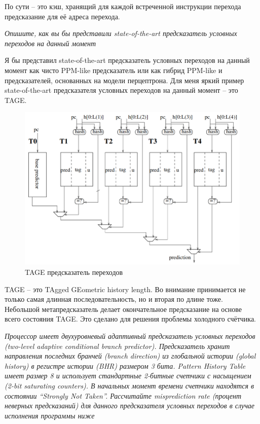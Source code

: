 	По сути -- это кэш, хранящий для каждой встреченной инструкции перехода предсказание для её адреса перехода.

	\textit{Опишите, как вы бы представили state-of-the-art предсказатель условных переходов на данный момент}
	
	Я бы представил state-of-the-art предсказатель условных переходов на данный момент как чисто PPM-like предсказатель или как гибрид PPM-like и предсказателей, основанных на модели перцептрона. Для меня яркий пример state-of-the-art предсказателя условных переходов на данный момент -- это TAGE.
	
	\begin{figure}[h!]
		\centering
		\includegraphics[width=\linewidth]{pictures/TAGE.png}
		\caption{TAGE предсказатель переходов}
	\end{figure}
	
	TAGE -- это TAgged GEometric history length. Во внимание принимается не только самая длинная последовательность, но и вторая по длине тоже. Небольшой метапредсказатель делает окончательное предсказание на основе всего состояния TAGE. Это сделано для решения проблемы холодного счётчика.
	
	\textit{Процессор имеет двухуровневый адаптивный предсказатель условных переходов (two-level adaptive conditional branch predictor). Предсказатель хранит направления последних бранчей (branch direction) из глобальной истории (global history) в регистре истории (BHR) размером 3 бита. Pattern History Table имеет размер 8 и использует стандартные 2-битные счетчики с насыщением (2-bit saturating counters). В начальных момент времени счетчики находятся в состоянии “Strongly Not Taken”. Рассчитайте misprediction rate (процент неверных предсказаний) для данного предсказателя условных переходов в случае исполнения программы ниже}
	
